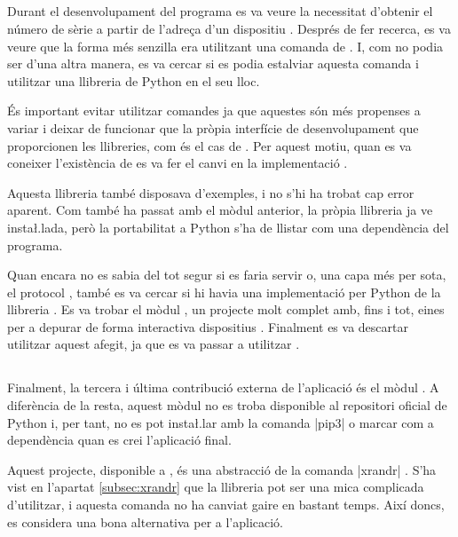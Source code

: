 \subsection{}

Durant el desenvolupament del programa es va veure la necessitat d'obtenir el
número de sèrie a partir de l'adreça d'un dispositiu . Després de fer
recerca, es va veure que la forma més senzilla era utilitzant una comanda
de . I, com no podia ser d'una altra manera, es va cercar si es podia
estalviar aquesta comanda i utilitzar una llibreria de Python en el seu lloc.

És important evitar utilitzar comandes ja que aquestes són més propenses a
variar i deixar de funcionar que la pròpia interfície de desenvolupament que
proporcionen les llibreries, com és el cas de . Per aquest motiu,
quan es va coneixer l'existència de  es va fer el canvi en la
implementació \cite{Pyudev}.

Aquesta llibreria també disposava d'exemples, i no s'hi ha trobat cap
error aparent. Com també ha passat amb el mòdul anterior, la pròpia llibreria
ja ve insta\l.lada, però la portabilitat a Python s'ha de llistar com una
dependència del programa.

Quan encara no es sabia del tot segur si es faria servir  o, una capa
més per sota, el protocol , també es va cercar si hi havia una
implementació per Python de la llibreria . Es va trobar el mòdul
, un projecte molt complet amb, fins i tot, eines per a
depurar de forma interactiva dispositius  \cite{CpythonHid}.
Finalment es va descartar utilitzar
aquest afegit, ja que es va passar a utilitzar .

\subsection{}
\label{subsec:pyrandr}

Finalment, la tercera i última contribució externa de l'aplicació és el
mòdul . A diferència de la resta, aquest mòdul no es troba
disponible al repositori oficial de Python  i, per tant, no es pot
insta\l.lar amb la comanda \ord|pip3| o marcar com a dependència quan es crei
l'aplicació final.

Aquest projecte, disponible a , és una abstracció de la comanda
\ord|xrandr| \cite{Pyrandr}. S'ha vist en l'apartat \ref{subsec:xrandr} que la
llibreria
 pot ser una mica complicada d'utilitzar, i aquesta comanda no ha
canviat gaire en bastant temps. Així doncs, es considera una bona alternativa
per a l'aplicació.


